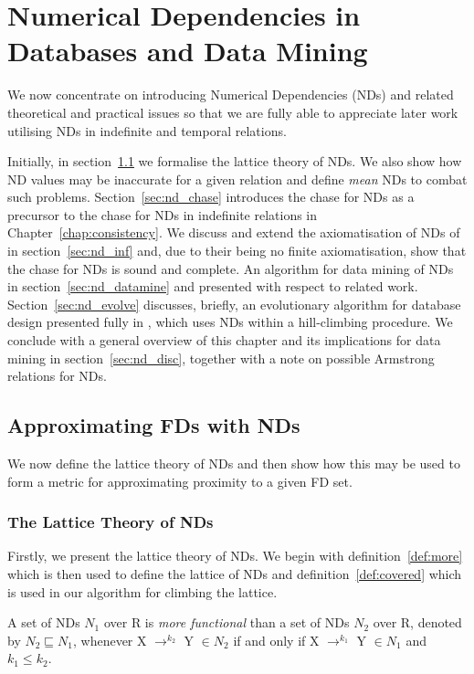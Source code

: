 \chapter{Numerical Dependencies in Databases and Data
Mining}\label{chap:numdep}

We now concentrate on introducing Numerical Dependencies (NDs) and
related theoretical and practical issues so that we are fully able to
appreciate later work utilising NDs in indefinite and temporal
relations.

\medskip

Initially, in section~\ref{sec:nd_approx} we formalise the lattice theory
of NDs. We also show how ND values may be inaccurate for a given
relation and define {\em mean} NDs to combat such
problems. Section~\ref{sec:nd_chase} introduces the chase for NDs as a
precursor to the chase for NDs in indefinite relations in
Chapter~\ref{chap:consistency}. We discuss and extend the
axiomatisation of NDs of \cite{gm85a} in section~\ref{sec:nd_inf}
and, due to their being no finite axiomatisation, show that the chase
for NDs is sound and complete.
An algorithm for data mining of NDs in
section~\ref{sec:nd_datamine} and presented with respect to related
work. Section~\ref{sec:nd_evolve} discusses, 
briefly, an evolutionary algorithm for database design presented fully
in \cite{cl96}, which uses NDs within a hill-climbing
procedure. We conclude with a general overview of
this chapter and its implications for data mining in
section~\ref{sec:nd_disc}, together with a note on possible Armstrong
relations for NDs.


\section{Approximating FDs with NDs}\label{sec:nd_approx}

We now define the lattice theory of NDs and then show how this may be
used to form a metric for approximating proximity to a given FD set. 

\subsection{The Lattice Theory of NDs}
Firstly, we present the lattice theory of NDs. We begin with
definition~\ref{def:more} which is then used to define the lattice of
NDs and definition~\ref{def:covered} which is used in our algorithm
for climbing the lattice.


\begin{definition}\label{def:more}
\begin{rm}
A set of NDs $N_1$ over R is {\em more functional} than a set of NDs 
$N_2$ over R, denoted by $N_2 \sqsubseteq N_1$, whenever
X $\to^{k_2}$ Y $\in N_2$ if and only if X $\to^{k_1}$ Y $\in N_1$ and 
$k_1 \le k_2$. 
\end{rm}
\end{definition}
\medskip

